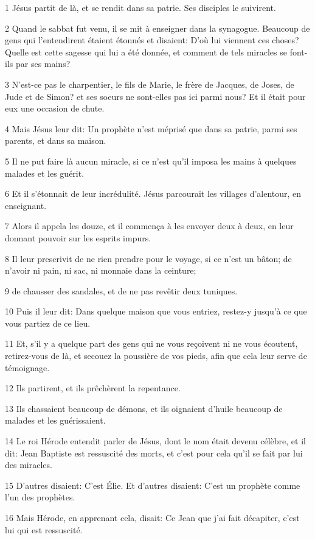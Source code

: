 \par 1 Jésus partit de là, et se rendit dans sa patrie. Ses disciples le suivirent.
\par 2 Quand le sabbat fut venu, il se mit à enseigner dans la synagogue. Beaucoup de gens qui l'entendirent étaient étonnés et disaient: D'où lui viennent ces choses? Quelle est cette sagesse qui lui a été donnée, et comment de tels miracles se font-ils par ses mains?
\par 3 N'est-ce pas le charpentier, le fils de Marie, le frère de Jacques, de Joses, de Jude et de Simon? et ses soeurs ne sont-elles pas ici parmi nous? Et il était pour eux une occasion de chute.
\par 4 Mais Jésus leur dit: Un prophète n'est méprisé que dans sa patrie, parmi ses parents, et dans sa maison.
\par 5 Il ne put faire là aucun miracle, si ce n'est qu'il imposa les mains à quelques malades et les guérit.
\par 6 Et il s'étonnait de leur incrédulité. Jésus parcourait les villages d'alentour, en enseignant.
\par 7 Alors il appela les douze, et il commença à les envoyer deux à deux, en leur donnant pouvoir sur les esprits impurs.
\par 8 Il leur prescrivit de ne rien prendre pour le voyage, si ce n'est un bâton; de n'avoir ni pain, ni sac, ni monnaie dans la ceinture;
\par 9 de chausser des sandales, et de ne pas revêtir deux tuniques.
\par 10 Puis il leur dit: Dans quelque maison que vous entriez, restez-y jusqu'à ce que vous partiez de ce lieu.
\par 11 Et, s'il y a quelque part des gens qui ne vous reçoivent ni ne vous écoutent, retirez-vous de là, et secouez la poussière de vos pieds, afin que cela leur serve de témoignage.
\par 12 Ils partirent, et ils prêchèrent la repentance.
\par 13 Ils chassaient beaucoup de démons, et ils oignaient d'huile beaucoup de malades et les guérissaient.
\par 14 Le roi Hérode entendit parler de Jésus, dont le nom était devenu célèbre, et il dit: Jean Baptiste est ressuscité des morts, et c'est pour cela qu'il se fait par lui des miracles.
\par 15 D'autres disaient: C'est Élie. Et d'autres disaient: C'est un prophète comme l'un des prophètes.
\par 16 Mais Hérode, en apprenant cela, disait: Ce Jean que j'ai fait décapiter, c'est lui qui est ressuscité.
